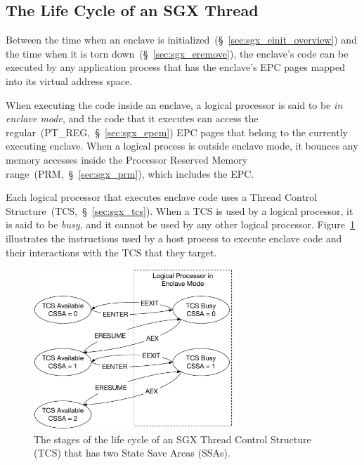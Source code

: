 \subsection{The Life Cycle of an SGX Thread}
\label{sec:sgx_threads}

Between the time when an enclave is
initialized~(\S~\ref{sec:sgx_einit_overview}) and the time when it is torn
down~(\S~\ref{sec:sgx_eremove}), the enclave's code can be executed by any
application process that has the enclave's EPC pages mapped into its virtual
address space.


When executing the code inside an enclave, a logical processor is said to be
\textit{in enclave mode}, and the code that it executes can access the
regular~(PT\_REG,~\S~\ref{sec:sgx_epcm}) EPC pages that belong to the currently
executing enclave. When a logical process is outside enclave mode, it bounces
any memory accesses inside the Processor Reserved Memory
range~(PRM,~\S~\ref{sec:sgx_prm}), which includes the EPC.

Each logical processor that executes enclave code uses a Thread Control
Structure~(TCS,~\S~\ref{sec:sgx_tcs}). When a TCS is used by a logical
processor, it is said to be \textit{busy}, and it cannot be used by any other
logical processor.  Figure~\ref{fig:sgx_tcs_lifecycle} illustrates the
instructions used by a host process to execute enclave code and their
interactions with the TCS that they target.

\begin{figure}[hbt]
  \centering
  \includegraphics[width=75mm]{figures/sgx_tcs_lifecycle.pdf}
  \caption{
    The stages of the life cycle of an SGX Thread Control Structure (TCS) that
    has two State Save Areas (SSAs).
  }
  \label{fig:sgx_tcs_lifecycle}
\end{figure}

